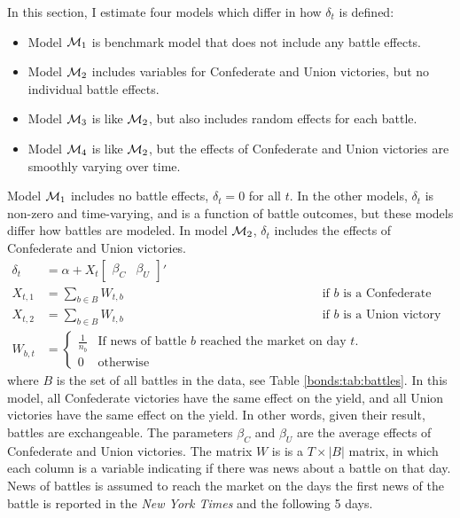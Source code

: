 In this section, I estimate four models which differ in how $\delta_{t}$ is defined:
\begin{itemize}
\item Model $\mathcal{M}_{\text{1}}$ is benchmark model that does not include any battle effects.
\item Model $\mathcal{M}_{\text{2}}$ includes variables for Confederate and Union victories, but no individual battle effects.
\item Model $\mathcal{M}_{\text{3}}$ is like $\mathcal{M}_{\text{2}}$, but also includes random effects for each battle.
\item Model $\mathcal{M}_{\text{4}}$ is like $\mathcal{M}_{\text{2}}$, but the effects of Confederate and Union victories are smoothly varying over time.
\end{itemize}
Model $\mathcal{M}_{\text{1}}$ includes no battle effects, $\delta_{t} = 0$ for all $t$.
In the other models, $\delta_{t}$ is non-zero and time-varying, and is a function of battle outcomes, but these models differ how battles are modeled.
In model $\mathcal{M}_{\text{2}}$, $\delta_{t}$ includes the effects of Confederate and Union victories.
\begin{align}
  \label{bonds:eq:2}
  \delta_{t} &= \alpha + X_{t} \begin{bmatrix}\beta_{C} & \beta_{U}\end{bmatrix}'  \\
  X_{t, 1} &= \sum_{b \in B} W_{t,b} && \text{if $b$ is a Confederate victory} \\
  X_{t, 2} &= \sum_{b \in B} W_{t,b} && \text{if $b$ is a Union victory} \\
  W_{b,t} &= 
            \begin{cases}
              \frac{1}{n_{b}} & \text{If news of battle $b$ reached the market on day $t$.} \\
              0 & \text{otherwise}
            \end{cases}
\end{align}
where $B$ is the set of all battles in the data, see Table \ref{bonds:tab:battles}.
In this model, all Confederate victories have the same effect on the yield, and all Union victories have the same effect on the yield. 
In other words, given their result, battles are exchangeable.
The parameters $\beta_{C}$ and $\beta_{U}$ are the average effects of Confederate and Union victories.
The matrix $W$ is is a $T \times |B|$ matrix, in which each column is a variable indicating if there was news about a battle on that day.
News of battles is assumed to reach the market on the days the first news of the battle is reported in the \textit{New York Times} and the following 5 days.
